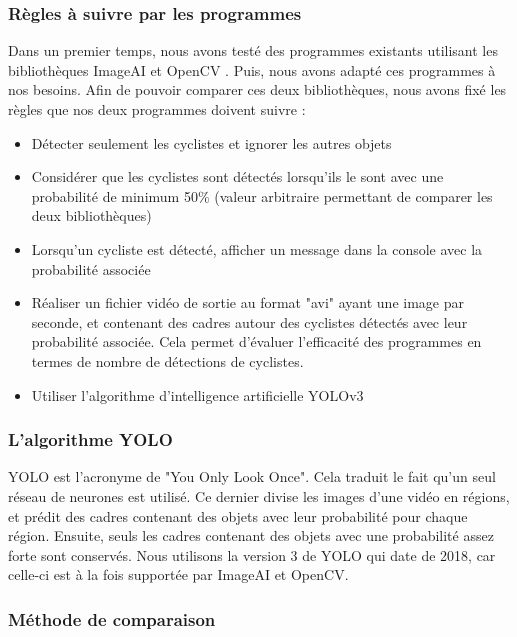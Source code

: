 \subsubsection{Règles à suivre par les programmes}
\label{sec:comparaisonIA:methode_recherche:regles}
Dans un premier temps, nous avons testé des programmes existants utilisant les bibliothèques ImageAI et OpenCV \cite{ImageAI_programme, OpenCV_programme}.
Puis, nous avons adapté ces programmes à nos besoins.
Afin de pouvoir comparer ces deux bibliothèques, nous avons fixé les règles que nos deux programmes doivent suivre :

\begin{itemize}
    \item Détecter seulement les cyclistes et ignorer les autres objets
    \item Considérer que les cyclistes sont détectés lorsqu'ils le sont avec une probabilité de minimum 50\% (valeur arbitraire permettant de comparer les deux bibliothèques)
    \item Lorsqu'un cycliste est détecté, afficher un message dans la console avec la probabilité associée
    \item Réaliser un fichier vidéo de sortie au format "avi" ayant une image par seconde, et contenant des cadres autour des cyclistes détectés avec leur probabilité associée. 
    Cela permet d'évaluer l'efficacité des programmes en termes de nombre de détections de cyclistes.
    \item Utiliser l'algorithme d'intelligence artificielle YOLOv3
\end{itemize}

\subsubsection{L'algorithme YOLO}
\label{sec:comparaisonIA:methode_recherche:yolo}

YOLO est l'acronyme de "You Only Look Once". Cela traduit le fait qu'un seul réseau de neurones est utilisé. \cite{Yolov3}
Ce dernier divise les images d'une vidéo en régions, et prédit des cadres contenant des objets avec leur probabilité pour chaque région.
Ensuite, seuls les cadres contenant des objets avec une probabilité assez forte sont conservés.
Nous utilisons la version 3 de YOLO qui date de 2018, car celle-ci est à la fois supportée par ImageAI et OpenCV.

\subsubsection{Méthode de comparaison}
\label{sec:comparaisonIA:methode_recherche:methode_comparaison}

